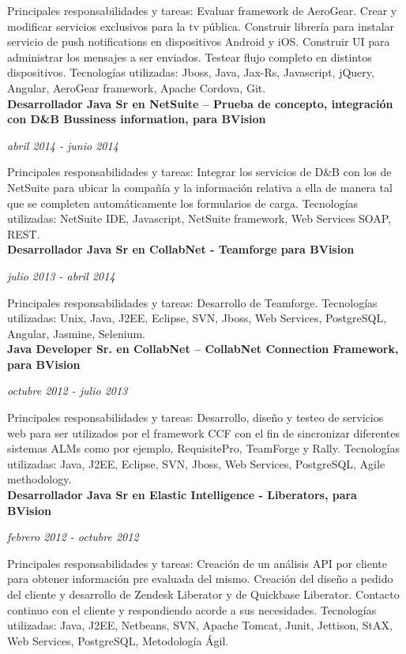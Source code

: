 \documentclass[a4paper,11pt]{article}
\begin{document}
\noindent Principales responsabilidades y tareas: Evaluar framework de
AeroGear. Crear y modificar servicios exclusivos para la tv pública. Construir
librería para instalar servicio de push notifications en dispositivos Android y
iOS. Construir UI para administrar los mensajes a ser enviados. Testear flujo
completo en distintos dispositivos.  Tecnologías utilizadas: Jboss, Java,
Jax-Rs, Javascript, jQuery, Angular, AeroGear framework, Apache Cordova, Git.
\\

\noindent \textbf{Desarrollador Java Sr en NetSuite – Prueba de concepto,
integración con D\&B Bussiness information, para BVision}

\noindent \emph{abril 2014 - junio 2014}

\noindent Principales responsabilidades y tareas: Integrar los servicios de D\&B
con los de NetSuite para ubicar la compañía y la información relativa a ella de
manera tal que se completen automáticamente los formularios de carga.
Tecnologías utilizadas: NetSuite IDE, Javascript, NetSuite framework, Web
Services SOAP, REST. \\

\noindent \textbf{Desarrollador Java Sr en CollabNet - Teamforge para BVision}

\noindent \emph{julio 2013 - abril 2014}

\noindent Principales responsabilidades y tareas: Desarrollo de Teamforge.
Tecnologías utilizadas: Unix, Java, J2EE, Eclipse, SVN, Jboss, Web Services,
PostgreSQL, Angular, Jasmine, Selenium. \\

\noindent \textbf{Java Developer Sr. en CollabNet – CollabNet Connection
Framework, para BVision}

\noindent \emph{octubre 2012 - julio 2013}

\noindent Principales responsabilidades y tareas: Desarrollo, diseño y testeo
de servicios web para ser utilizados por el framework CCF con el fin de
sincronizar diferentes sistemas ALMs como por ejemplo, RequisitePro, TeamForge
y Rally.
Tecnologías utilizadas: Java, J2EE, Eclipse, SVN, Jboss, Web Services,
PostgreSQL, Agile methodology. \\

\noindent \textbf{Desarrollador Java Sr en Elastic Intelligence - Liberators,
para BVision}

\noindent \emph{febrero 2012 - octubre 2012}

\noindent Principales responsabilidades y tareas: Creación de un análisis API
por cliente para obtener información pre evaluada del mismo. Creación del
diseño a pedido del cliente y desarrollo de Zendesk Liberator y de Quickbase
Liberator. Contacto continuo con el cliente y respondiendo acorde a sus
necesidades.  Tecnologías utilizadas: Java, J2EE, Netbeans, SVN, Apache Tomcat,
Junit, Jettison, StAX, Web Services, PostgreSQL, Metodología Ágil. \\
\end{document}

